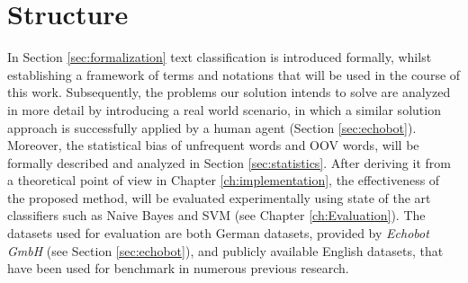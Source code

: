 \section{Structure}
In Section \ref{sec:formalization} text classification is introduced formally,
whilst establishing a framework of terms and notations that will be used in the course of this work. 
Subsequently, the problems our solution intends to solve are analyzed in more
detail by introducing a real world scenario, in which a similar solution approach is successfully applied by a human agent (Section \ref{sec:echobot}).
Moreover, the statistical bias of unfrequent words and OOV words, will be
formally described and analyzed in Section \ref{sec:statistics}. After deriving it from a 
theoretical point of view in Chapter \ref{ch:implementation}, the effectiveness
of the proposed method, will be evaluated experimentally using state of the art classifiers 
such as Naive Bayes and SVM (see Chapter \ref{ch:Evaluation}). The datasets used
for evaluation are both German datasets, provided by \emph{Echobot GmbH} (see Section \ref{sec:echobot}), 
and publicly available English datasets, that have been used for benchmark in numerous previous research. 
 